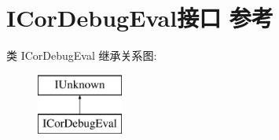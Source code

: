 \hypertarget{interface_i_cor_debug_eval}{}\section{I\+Cor\+Debug\+Eval接口 参考}
\label{interface_i_cor_debug_eval}
类 I\+Cor\+Debug\+Eval 继承关系图\+:\begin{figure}[H]
\begin{center}
\leavevmode
\includegraphics[height=2.000000cm]{interface_i_cor_debug_eval}
\end{center}
\end{figure}
